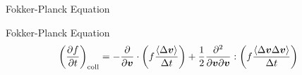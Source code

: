 \begin{frame}{Fokker-Planck Equation}

    \begin{block}{Fokker-Planck Equation}
        \begin{align}
            \label{eq:fokkerPlanckTerm}
            \left( \frac{\partial f}{\partial t} \right)_{\text{coll}} &= - \frac{\partial}{\partial \boldsymbol{v}}
            \cdot \left( f \frac{\langle \Delta \boldsymbol{v} \rangle }{\Delta t} \right) + \frac{1}{2}
            \frac{\partial^2}{\partial \boldsymbol{v} \partial \boldsymbol{v}} : \left( f \frac{ \langle \Delta \boldsymbol{v}
            \Delta \boldsymbol{v} \rangle}{\Delta t} \right)
        \end{align}
    \end{block}
    
    \vspace{3mm}


\end{frame}

